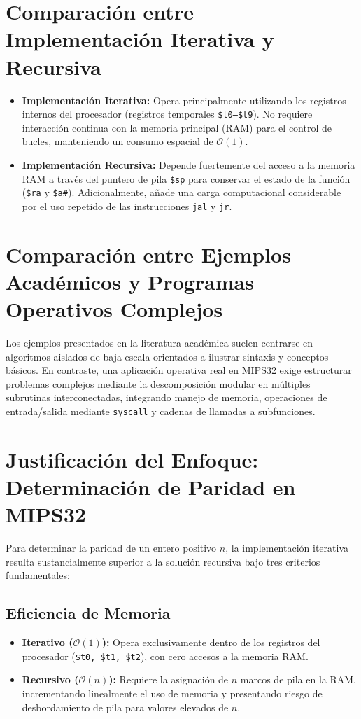 \documentclass[12pt,a4paper]{article}
\begin{document}
\section{Comparación entre Implementación Iterativa y Recursiva}

\begin{itemize}
    \item \textbf{Implementación Iterativa:} Opera principalmente utilizando los registros internos del procesador (registros temporales \texttt{\$t0--\$t9}). No requiere interacción continua con la memoria principal (RAM) para el control de bucles, manteniendo un consumo espacial de $\mathcal{O}(1)$.
    \item \textbf{Implementación Recursiva:} Depende fuertemente del acceso a la memoria RAM a través del puntero de pila \texttt{\$sp} para conservar el estado de la función (\texttt{\$ra} y \texttt{\$a\#}). Adicionalmente, añade una carga computacional considerable por el uso repetido de las instrucciones \texttt{jal} y \texttt{jr}.
\end{itemize}

\section{Comparación entre Ejemplos Académicos y Programas Operativos Complejos}

Los ejemplos presentados en la literatura académica suelen centrarse en algoritmos aislados de baja escala orientados a ilustrar sintaxis y conceptos básicos. En contraste, una aplicación operativa real en MIPS32 exige estructurar problemas complejos mediante la descomposición modular en múltiples subrutinas interconectadas, integrando manejo de memoria, operaciones de entrada/salida mediante \texttt{syscall} y cadenas de llamadas a subfunciones.

\section{Justificación del Enfoque: Determinación de Paridad en MIPS32}

Para determinar la paridad de un entero positivo $n$, la implementación iterativa resulta sustancialmente superior a la solución recursiva bajo tres criterios fundamentales:

\subsection{Eficiencia de Memoria}
\begin{itemize}
    \item \textbf{Iterativo ($\mathcal{O}(1)$):} Opera exclusivamente dentro de los registros del procesador (\texttt{\$t0, \$t1, \$t2}), con cero accesos a la memoria RAM.
    \item \textbf{Recursivo ($\mathcal{O}(n)$):} Requiere la asignación de $n$ marcos de pila en la RAM, incrementando linealmente el uso de memoria y presentando riesgo de desbordamiento de pila para valores elevados de $n$.
\end{itemize}
\end{document}
